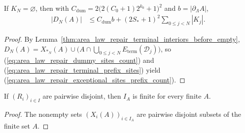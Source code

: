 \begin{lemma}
    \label{thm:area_law_repair_exceptional_sites_prefix_count}
    \leanok
    If $K_N=\varnothing$, then with $C_{\mathrm{dum}}=2\bigl(2(C_0+1)2^{k_0}+1\bigr)^2$ and
    $b=|\partial_\Lambda A|$,
    \begin{align}
        |D_N(A)|
         & \le C_{\mathrm{dum}}b+(2S_*+1)^2\sum_{0\le j<N}|K_j|.
        \label{eq:area_law_repair_exceptional_sites_prefix_count}
    \end{align}
\end{lemma}

\begin{proof}
    \leanok
    By Lemma~\ref{thm:area_law_repair_terminal_interiors_before_empty},
    $D_N(A)=X_{*_N}(A)\cup\bigl(A\cap\bigcup_{0\le j<N}E_{\mathrm{term}}(\mathcal D_j)\bigr)$,
    so (\ref{eq:area_law_repair_dummy_sites_count}) and
    (\ref{eq:area_law_repair_terminal_prefix_sites}) yield
    (\ref{eq:area_law_repair_exceptional_sites_prefix_count}).
\end{proof}

\begin{lemma}
    \label{lem:area_law_repair_region_sites_finite}
    \leanok
    If $(R_i)_{i\in I}$ are pairwise disjoint, then $I_A$ is finite for every finite $A$.
\end{lemma}
\begin{proof}\leanok
    The nonempty sets $(X_i(A))_{i\in I_A}$ are pairwise disjoint subsets of the finite set $A$.
\end{proof}

